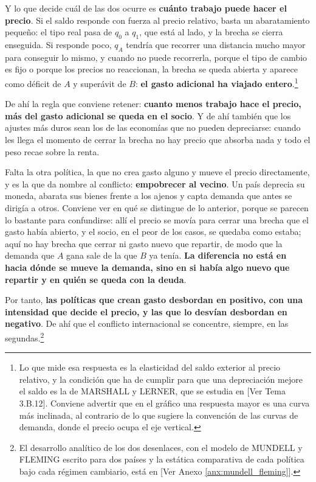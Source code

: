 \documentclass[10pt,a4paper]{article}
\newcommand{\authorfont}[1]{{\fontfamily{EBGaramond-TLF}\selectfont #1}}
\begin{document}
{Y lo que decide cuál de las dos ocurre es \textbf{cuánto trabajo puede hacer el precio}. Si el saldo responde con fuerza al precio relativo, basta un abaratamiento pequeño: el tipo real pasa de $q_0$ a $q_1$, que está al lado, y la brecha se cierra enseguida. Si responde poco, $q_A$ tendría que recorrer una distancia mucho mayor para conseguir lo mismo, y cuando no puede recorrerla, porque el tipo de cambio es fijo o porque los precios no reaccionan, la brecha se queda abierta y aparece como déficit de $A$ y superávit de $B$: \textbf{el gasto adicional ha viajado entero}.\footnote{%
    Lo que mide esa respuesta es la elasticidad del saldo exterior al precio relativo, y la condición que ha de cumplir para que una depreciación mejore el saldo es la de MARSHALL y LERNER, que se estudia en [\authorfont{Ver Tema 3.B.12}]. Conviene advertir que en el gráfico una respuesta mayor es una curva más inclinada, al contrario de lo que sugiere la convención de las curvas de demanda, donde el precio ocupa el eje vertical.
}

De ahí la regla que conviene retener: \textbf{cuanto menos trabajo hace el precio, más del gasto adicional se queda en el socio}. Y de ahí también que los ajustes más duros sean los de las economías que no pueden depreciarse: cuando les llega el momento de cerrar la brecha no hay precio que absorba nada y todo el peso recae sobre la renta.

Falta la otra política, la que no crea gasto alguno y mueve el precio directamente, y es la que da nombre al conflicto: \textbf{empobrecer al vecino}. Un país deprecia su moneda, abarata sus bienes frente a los ajenos y capta demanda que antes se dirigía a otros. Conviene ver en qué se distingue de lo anterior, porque se parecen lo bastante para confundirse: allí el precio se movía para cerrar una brecha que el gasto había abierto, y el socio, en el peor de los casos, se quedaba como estaba; aquí no hay brecha que cerrar ni gasto nuevo que repartir, de modo que la demanda que $A$ gana sale de la que $B$ ya tenía. \textbf{La diferencia no está en hacia dónde se mueve la demanda, sino en si había algo nuevo que repartir y en quién se queda con la deuda}.

Por tanto, \textbf{las políticas que crean gasto desbordan en positivo, con una intensidad que decide el precio, y las que lo desvían desbordan en negativo}. De ahí que el conflicto internacional se concentre, siempre, en las segundas.\footnote{%
    El desarrollo analítico de los dos desenlaces, con el modelo de MUNDELL y FLEMING escrito para dos países y la estática comparativa de cada política bajo cada régimen cambiario, está en [\authorfont{Ver Anexo \ref{anx:mundell_fleming}}].
}

}
\end{document}
